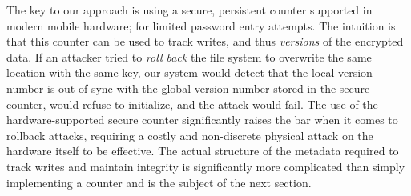 The key to our approach is using a secure, persistent counter supported in
modern mobile hardware; \eg{} for limited password entry attempts.  The
intuition is that this counter can be used to track writes, and thus
\emph{versions} of the encrypted data.  If an attacker tried to \emph{roll back}
the file system to overwrite the same location with the same key, our system
would detect that the local version number is out of sync with the global
version number stored in the secure counter, \SYSTEM{} would refuse to
initialize, and the attack would fail. The use of the hardware-supported secure
counter significantly raises the bar when it comes to rollback attacks,
requiring a costly and non-discrete physical attack on the hardware itself to be
effective. The actual structure of the metadata required to track writes and
maintain integrity is significantly more complicated than simply implementing a
counter and is the subject of the next section.
